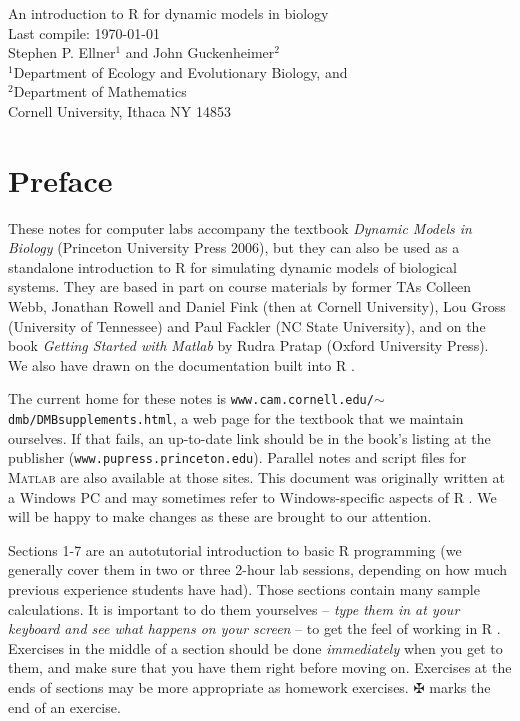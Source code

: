 \documentclass [11pt]{article}
\newcounter{exercise}
\numberwithin{exercise}{section}
\def\R{R }
\begin{document}
\begin{center}
\Large An introduction to \R for dynamic models in biology\\
\normalsize Last compile: \today \\
\vspace{0.25in}
\large  
Stephen P. Ellner$^1$ and John Guckenheimer$^2$\\ 
${}^1$Department of Ecology and Evolutionary Biology, and \\
${}^2$Department of Mathematics \\
Cornell University, Ithaca NY 14853 \\
\normalsize 
\end{center}

\tableofcontents 

\section*{Preface}
These notes for computer labs accompany the textbook \textit{Dynamic Models in Biology} (Princeton University
Press 2006), but they can also be used as a standalone introduction to \R for
simulating dynamic models of biological systems. They are based in part on course materials 
by former TAs Colleen Webb, Jonathan Rowell and Daniel Fink (then at Cornell University), 
Lou Gross (University of Tennessee) and Paul Fackler (NC State University), and on the book 
\textit{Getting Started with Matlab} by Rudra Pratap (Oxford University Press). 
We also have drawn on the documentation built into \R.  
 
The current home for these notes is \texttt{www.cam.cornell.edu/$\sim$dmb/DMBsupplements.html},
a web page for the textbook that we maintain ourselves. If that fails, an up-to-date link should 
be in the book's listing at the publisher (\texttt{www.pupress.princeton.edu}). Parallel notes
and script files for \textsc{Matlab} are also available at those sites. 
This document was originally written at a Windows PC and may sometimes refer to Windows-specific
aspects of \R. We will be happy to make changes as these are brought to our attention.   

Sections 1-7 are an autotutorial introduction to basic \R programming (we  
generally cover them in two or three 2-hour lab sessions, depending on how much previous
experience students have had). Those sections contain many sample calculations. It is important to 
do them yourselves -- \textit{type them in at your keyboard and see what
happens on your screen} -- to get the feel of working in \R. 
Exercises in the middle of a section should be done \textit{immediately} when you 
get to them, and make sure that you have them right 
before moving on. Exercises at the ends of sections may be more 
appropriate as homework exercises. $\maltese$ marks the end of an exercise. 
\end{document}
